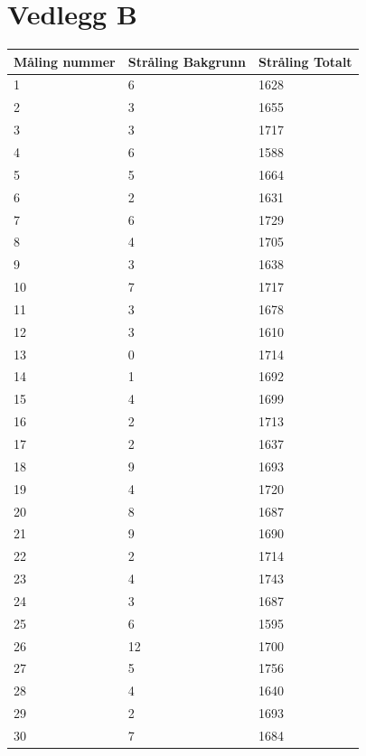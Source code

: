 \documentclass[twocolumn, 11pt]{article} %
\begin{document}
\section{Vedlegg B}
\label{RådataVedlegg}
\begin{longtable}{lll}
Måling nummer & Stråling Bakgrunn & Stråling Totalt \\
\endfirsthead
%
\endhead
%
1         & 6        & 1628     \\
2         & 3        & 1655     \\
3         & 3        & 1717     \\
4         & 6        & 1588     \\
5         & 5        & 1664     \\
6         & 2        & 1631     \\
7         & 6        & 1729     \\
8         & 4        & 1705     \\
9         & 3        & 1638     \\
10        & 7        & 1717     \\
11        & 3        & 1678     \\
12        & 3        & 1610     \\
13        & 0        & 1714     \\
14        & 1        & 1692     \\
15        & 4        & 1699     \\
16        & 2        & 1713     \\
17        & 2        & 1637     \\
18        & 9        & 1693     \\
19        & 4        & 1720     \\
20        & 8        & 1687     \\
21        & 9        & 1690     \\
22        & 2        & 1714     \\
23        & 4        & 1743     \\
24        & 3        & 1687     \\
25        & 6        & 1595     \\
26        & 12       & 1700     \\
27        & 5        & 1756     \\
28        & 4        & 1640     \\
29        & 2        & 1693     \\
30        & 7        & 1684     \\

\end{longtable}
\end{document}

